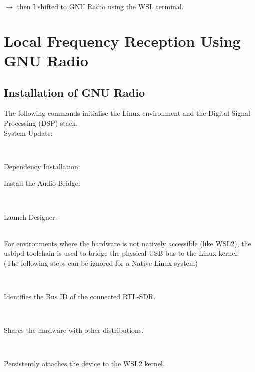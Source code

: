 \documentclass[journal]{IEEEtran}
\begin{document}
$\rightarrow$ then I shifted to GNU Radio using the WSL terminal.
\section{Local Frequency Reception Using GNU Radio}
\subsection{Installation of GNU Radio}

The following commands initialise the Linux environment and the Digital Signal Processing (DSP) stack.\\

 System Update:   
    \begin{center}
        \\
    \end{center}
Dependency Installation:
\begin{center}
    \end{center}
Install the Audio Bridge:
    \begin{center}
    \\
     \end{center}
Launch Designer:
     \begin{center}
    \end{center}
\\
For environments where the hardware is not natively accessible (like WSL2), the usbipd toolchain is used to bridge the physical USB bus to the Linux kernel.\\

(The following steps can be ignored for a Native Linux system)\\
    \begin{center}
    \\
    \end{center}
    Identifies the Bus ID of the connected RTL-SDR.\\
    \begin{center}
    \\
     \end{center}
    Shares the hardware with other distributions.\\
    \begin{center}
\\
\end{center}
Persistently attaches the device to the WSL2 kernel.\\
\end{document}
